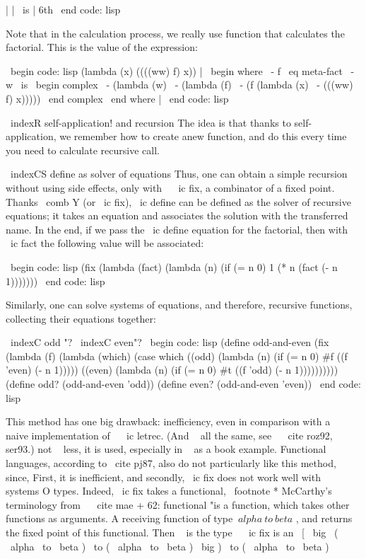 {| | \ is | 6th
\ end {code: lisp}

Note that in the calculation process, we really use
function that calculates the factorial. This is the value of the expression:

\ begin {code: lisp}
(lambda (x)
  ((((ww) f) x)) | \ begin {where}
                  \ - f { \ eq } meta-fact
                  \ - w { \ is } \ begin {complex}
                            \ - (lambda (w)
                            \ -   (lambda (f)
                            \ -     (f (lambda (x)
                            \ -          (((ww) f) x)))))
                            \ end {complex}
                  \ end {where} |
\ end {code: lisp}

\ indexR {self-application! and recursion}
The idea is that thanks to self-application, we remember how to create anew
function, and do this every time you need to calculate
recursive call.

\ indexCS {define} {as solver of equations}
Thus, one can obtain a simple recursion without using side
effects, only with ~ \ ic {fix}, a combinator of a fixed point. Thanks
\ comb {Y} (or \ ic {fix}), \ ic {define} can be defined as the solver of recursive
equations; it takes an equation and associates the solution with the transferred name.
In the end, if we pass the \ ic {define} equation for the factorial, then with ~ \ ic {fact}
the following value will be associated:

\ begin {code: lisp}
(fix (lambda (fact)
       (lambda (n)
         (if (= n 0) 1
             (* n (fact (- n 1)))))))
\ end {code: lisp}

Similarly, one can solve systems of equations, and therefore,
recursive functions, collecting their equations together:

\ indexC {odd "?} \ indexC {even"?}
\ begin {code: lisp}
(define odd-and-even
  (fix (lambda (f)
         (lambda (which)
           (case which
             ((odd) (lambda (n) (if (= n 0) #f
                                    ((f 'even) (- n 1)))))
             ((even) (lambda (n) (if (= n 0) #t
                                     ((f 'odd) (- n 1))))))))))
(define odd? (odd-and-even 'odd))
(define even? (odd-and-even 'even))
\ end {code: lisp}

This method has one big drawback: inefficiency, even in comparison
with a ~ naive implementation of ~ \ ic {letrec}. (And ~ all the same, see ~ \ cite {roz92, ser93}.)
not ~ less, it is used, especially in ~ as a book example. Functional
languages, according to \ cite {pj87}, also do not particularly like this method, since,
First, it is inefficient, and secondly, \ ic {fix} does not work well with ~ systems
O types. Indeed, \ ic {fix} takes a functional, %
\ footnote * {McCarthy's terminology from ~ \ cite {mae + 62}: functional "is a function,
which takes other functions as arguments.} A receiving function of type $ \ alpha  \ to
\ beta $ , and returns the fixed point of this functional. Then ~ is the type ~ \ ic {fix}
is an
%
\ [  \ big \ ( \ alpha  \ to  \ beta ) \ to ( \ alpha  \ to  \ beta ) \ big ) \ to ( \ alpha  \ to  \ beta ) \]

}
